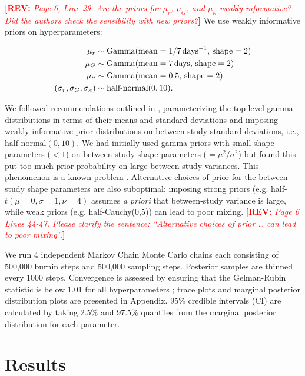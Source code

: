 \documentclass[12pt]{article}
\newcommand{\comment}[3]{\textcolor{#1}{\textbf{[#2: }\textsl{#3}\textbf{]}}}
\newcommand{\rev}[1]{\comment{red}{REV}{#1}}
\begin{document}
\rev{Page 6, Line 29. Are the priors for $\mu_r$, $\mu_G$, and $\mu_\kappa$ weakly informative? Did the
authors check the sensibility with new priors?}
We use weakly informative priors on hyperparameters:
\begin{linenomath*}
\begin{equation}
\begin{aligned}
\mu_r &\sim \mathrm{Gamma}(\mathrm{mean}=1/7\,\mathrm{days}^{-1},\,\mathrm{shape}=2)\\
\mu_G &\sim \mathrm{Gamma}(\mathrm{mean}=7\,\mathrm{days},\,\mathrm{shape}=2)\\
\mu_\kappa &\sim \mathrm{Gamma}(\mathrm{mean}=0.5,\,\mathrm{shape}=2)\\
(\sigma_r, \sigma_G, \sigma_\kappa) &\sim \textrm{half-normal}(0, 10).
\end{aligned}
\end{equation}
\end{linenomath*}
We followed recommendations outlined in \cite{gelman2006prior}, parameterizing the top-level gamma distributions in terms of their means and standard deviations and imposing weakly informative prior distributions on between-study standard deviations, i.e., $\textrm{half-normal}(0, 10)$.
We had initially used gamma priors with small shape parameters ($< 1$) on between-study shape parameters ($=\mu^2/\sigma^2$) but found this put too much prior probability on large between-study variances. This phenomenon is a known problem \citep{gelman2006prior}.
Alternative choices of prior for the between-study shape parameters are also suboptimal: imposing strong priors (e.g. half-$t(\mu=0,\sigma=1,\nu=4)$  assumes \textit{a priori} that between-study variance is large,  while weak priors (e.g. half-Cauchy(0,5)) can lead to poor mixing.
\rev{Page 6 Lines 44-47. Please clarify the sentence: “Alternative choices of prior … can lead to
poor mixing”.}

We run 4 independent Markov Chain Monte Carlo chains each consisting of 500,000 burnin steps and 500,000 sampling steps.
Posterior samples are thinned every 1000 steps.
Convergence is assessed by ensuring that the Gelman-Rubin statistic is below 1.01 for all hyperparameters \citep{gelman1992inference};
trace plots and marginal posterior distribution plots are presented in Appendix.
95\% credible intervals (CI) are calculated by taking 2.5\% and 97.5\% quantiles from the marginal posterior distribution for each parameter.

\section{Results}
\end{document}
